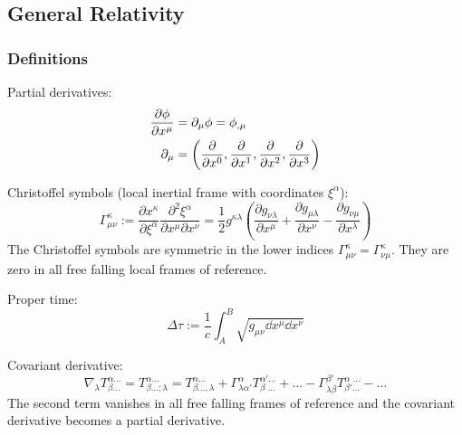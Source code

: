 	\subsection{General Relativity}
		\subsubsection{Definitions}
			\noindent
			Partial derivatives:
			\begin{equation}
				\begin{aligned}
					\pdv{\phi}{x^\mu} &= \partial_\mu \phi = \phi_{,\mu} \\
					\partial_\mu &= \qty(\pdv{x^0}, \pdv{x^1}, \pdv{x^2}, \pdv{x^3}) \\					
				\end{aligned}
			\end{equation}

			\noindent
			Christoffel symbols (local inertial frame with coordinates $\xi^\alpha$):
			\begin{equation}
				\Gamma_{\mu\nu}^{\kappa} := \frac{\partial x^\kappa}{\partial \xi^\alpha}\frac{\partial^2 \xi^\alpha}{\partial x^\mu\partial x^\nu}
				=\frac{1}{2}g^{\kappa\lambda}\left(\frac{\partial g_{\nu\lambda}}{\partial x^\mu}+\frac{\partial g_{\mu\lambda}}{\partial x^\nu}-\frac{\partial g_{\nu\mu}}{\partial x^\lambda}\right)
			\end{equation}
			The Christoffel symbols are symmetric in the lower indices $\Gamma_{\mu\nu}^{\kappa} = \Gamma_{\nu\mu}^{\kappa}$. They are zero in all free falling local frames of reference.

			\noindent
			Proper time:
			\begin{equation}
				\Delta\tau := \frac{1}{c}\int_A^B\sqrt{g_{\mu\nu}\dd x^\mu \dd x^\nu}
			\end{equation}

			\noindent
			Covariant derivative:
			\begin{equation}
				\nabla_\lambda T^{\alpha ...}_{\beta...} =
				T^{\alpha ...}_{\beta...;\lambda} = T^{\alpha...}_{\beta ...,\lambda}
				+ \Gamma^\alpha_{\lambda\alpha'} T^{\alpha'...}_{\beta\phantom{\prime}...} + ...
				-\Gamma^{\beta'}_{\lambda\beta} T^{\alpha\phantom{\prime}...}_{\beta'...} - ...
			\end{equation}
			The second term vanishes in all free falling frames of reference and the covariant derivative becomes a partial derivative.

